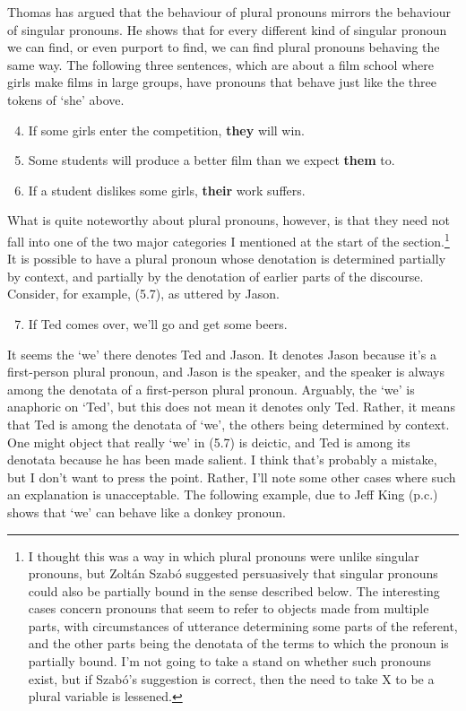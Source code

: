 Thomas \cite[Ch. 9]{McKay2006} has argued that the behaviour of plural pronouns mirrors the behaviour of singular pronouns. He shows that for every different kind of singular pronoun we can find, or even purport to find, we can find plural pronouns behaving the same way. The following three sentences, which are about a film school where girls make films in large groups, have pronouns that behave just like the three tokens of `she' above.

\renewcommand{\labelenumi}{(5.\arabic{enumi})}
\begin{enumerate}
\setcounter{enumi}{3}
\item If some girls enter the competition, \textbf{they} will win.

\item Some students will produce a better film than we expect \textbf{them} to.

\item If a student dislikes some girls, \textbf{their} work suffers.
\end{enumerate}

\noindent What is quite noteworthy about plural pronouns, however, is that they need not fall into one of the two major categories I mentioned at the start of the section.\footnote{ I thought this was a way in which plural pronouns were unlike singular pronouns, but Zolt\'{a}n Szab\'{o} suggested persuasively that singular pronouns could also be partially bound in the sense described below. The interesting cases concern pronouns that seem to refer to objects made from multiple parts, with circumstances of utterance determining some parts of the referent, and the other parts being the denotata of the terms to which the pronoun is partially bound. I'm not going to take a stand on whether such pronouns exist, but if Szab\'{o}'s suggestion is correct, then the need to take X to be a plural variable is lessened.} It is possible to have a plural pronoun whose denotation is determined partially by context, and partially by the denotation of earlier parts of the discourse. Consider, for example, (5.7), as uttered by Jason.

\renewcommand{\labelenumi}{(5.\arabic{enumi})}
\begin{enumerate}
\setcounter{enumi}{6}
\item If Ted comes over, we'll go and get some beers.
\end{enumerate}

\noindent It seems the `we' there denotes Ted and Jason. It denotes Jason because it's a first-person plural pronoun, and Jason is the speaker, and the speaker is always among the denotata of a first-person plural pronoun. Arguably, the `we' is anaphoric on `Ted', but this does not mean it denotes only Ted. Rather, it means that Ted is among the denotata of `we', the others being determined by context. One might object that really `we' in (5.7) is deictic, and Ted is among its denotata because he has been made salient. I think that's probably a mistake, but I don't want to press the point. Rather, I'll note some other cases where such an explanation is unacceptable. The following example, due to Jeff King (p.c.) shows that `we' can behave like a donkey pronoun.


